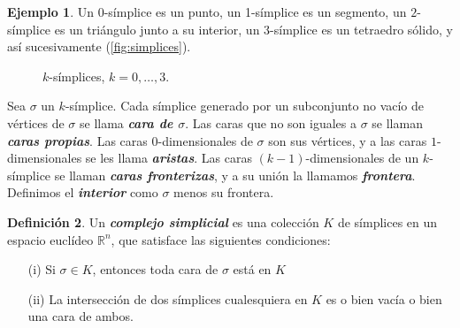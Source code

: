 \documentclass[10pt]{report}
\newcommand{\R}{\mathbb{R}}
\newcommand{\enfatiza}[1]{\textbf{\textit{#1}}}
\theoremstyle{definition}
\newtheorem{defin}{Definición}[section]
\newtheorem{eje}[defin]{Ejemplo}
\begin{document}
\begin{eje}
Un $0$-símplice es un punto, un 1-símplice es un segmento, un $2$-símplice es un triángulo junto a su interior, un $3$-símplice es un tetraedro sólido, y así sucesivamente (\autoref{fig:simplices}).
\end{eje}
\begin{figure}[]
\centering
{}
\caption{$k$-símplices, $k=0,\dots ,3$.\label{fig:simplices}}
\end{figure}

Sea $\sigma$ un $k$-símplice. Cada símplice generado por un subconjunto no vacío de vértices de $\sigma$ se llama \enfatiza{cara de $\sigma$}. Las caras que no son iguales a $\sigma$ se llaman \enfatiza{caras propias}. Las caras $0$-dimensionales de $\sigma$ son sus vértices, y a las caras $1$-dimensionales se les llama \enfatiza{aristas}. Las caras $(k-1)$-dimensionales de un $k$-símplice se llaman \enfatiza{caras fronterizas}, y a su unión la llamamos \enfatiza{frontera}. Definimos el \enfatiza{interior} como $\sigma$ menos su frontera. 


\begin{defin}%
Un \enfatiza{complejo simplicial} es una colección $K$ de símplices en un espacio euclídeo $\R ^n$, que satisface las siguientes condiciones:
\begin{itemize}
\item[(i)] Si $\sigma \in K $, entonces toda cara de $\sigma$ está en $K$
\item[(ii)] La intersección de dos símplices cualesquiera en $K$ es o bien vacía o bien una cara de ambos.
\end{itemize}
\label{def:complex}
\end{defin}
\end{document}
